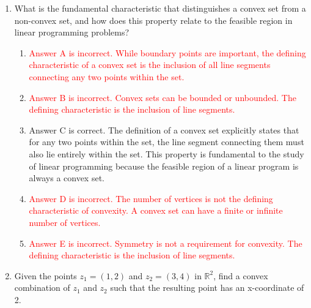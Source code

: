 \documentclass{article}%
\newcommand{\incorrect}[1]{\textcolor{red}{#1}}
\begin{document}
\begin{enumerate}
\begin{enumerate}
\item \incorrect{This describes the Separating Hyperplane Theorem, not Carathéodory's Theorem.}%
\item \incorrect{While the convex hull of a finite set is closed, this is not the statement of Carathéodory's Theorem.}%
\item \incorrect{Carathéodory's Theorem doesn't directly provide a method for finding extreme points, though it's related to their representation.}%
\item \incorrect{Carathéodory's Theorem applies to both bounded and unbounded convex sets.}%
\end{enumerate}%
\vspace{1em}%
\item What is the fundamental characteristic that distinguishes a convex set from a non-convex set, and how does this property relate to the feasible region in linear programming problems?%
\begin{enumerate}%
\item \incorrect{Answer A is incorrect. While boundary points are important, the defining characteristic of a convex set is the inclusion of all line segments connecting any two points within the set.}%
\item \incorrect{Answer B is incorrect. Convex sets can be bounded or unbounded.  The defining characteristic is the inclusion of line segments.}%
\item Answer C is correct. The definition of a convex set explicitly states that for any two points within the set, the line segment connecting them must also lie entirely within the set. This property is fundamental to the study of linear programming because the feasible region of a linear program is always a convex set.%
\item \incorrect{Answer D is incorrect.  The number of vertices is not the defining characteristic of convexity.  A convex set can have a finite or infinite number of vertices.}%
\item \incorrect{Answer E is incorrect. Symmetry is not a requirement for convexity. The defining characteristic is the inclusion of line segments.}%
\end{enumerate}%
\vspace{1em}%
\item Given the points $z_1 = (1, 2)$ and $z_2 = (3, 4)$ in $\mathbb{R}^2$, find a convex combination of $z_1$ and $z_2$ such that the resulting point has an x-coordinate of 2.%
\begin{enumerate}%

\end{enumerate}
\end{enumerate}
\end{document}
